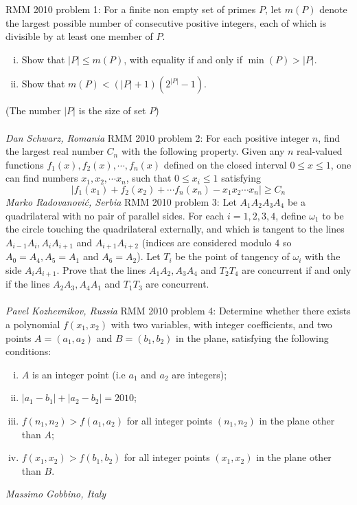 RMM 2010 problem 1:  For a finite non empty set of primes $P$, let $m(P)$ denote the largest possible number of consecutive positive integers, each of which is divisible by at least one member of $P$.
\begin{enumerate}[(i)]
  \item Show that $|P|\le m(P)$, with equality if and only if $\min(P)>|P|$.
  \item Show that $m(P)<(|P|+1)(2^{|P|}-1)$.
\end{enumerate}
(The number $|P|$ is the size of set $P$) \\\\
\textit{Dan Schwarz, Romania} 
RMM 2010 problem 2:  For each positive integer $n$, find the largest real number $C_n$ with the following property. Given any $n$ real-valued functions $f_1(x), f_2(x), \cdots, f_n(x)$ defined on the closed interval $0 \le x \le 1$, one can find numbers $x_1, x_2, \cdots x_n$, such that $0 \le x_i \le 1$ satisfying
\[ |f_1(x_1)+f_2(x_2)+\cdots f_n(x_n)-x_1x_2\cdots x_n| \ge C_n \]
\textit{Marko Radovanović, Serbia} 
RMM 2010 problem 3:  Let $A_1A_2A_3A_4$ be a quadrilateral with no pair of parallel sides. For each $i=1, 2, 3, 4$, define $\omega_1$ to be the circle touching the quadrilateral externally, and which is tangent to the lines $A_{i-1}A_i, A_iA_{i+1}$ and $A_{i+1}A_{i+2}$ (indices are considered modulo $4$ so $A_0=A_4, A_5=A_1$ and $A_6=A_2$). Let $T_i$ be the point of tangency of $\omega_i$ with the side $A_iA_{i+1}$. Prove that the lines $A_1A_2, A_3A_4$ and $T_2T_4$ are concurrent if and only if the lines $A_2A_3, A_4A_1$ and $T_1T_3$ are concurrent. \\\\
\textit{Pavel Kozhevnikov, Russia} 
RMM 2010 problem 4:  Determine whether there exists a polynomial $f(x_1, x_2)$ with two variables, with integer coefficients, and two points $A=(a_1, a_2)$ and $B=(b_1, b_2)$ in the plane, satisfying the following conditions:
\begin{enumerate}[(i)]
  \item $A$ is an integer point (i.e $a_1$ and $a_2$ are integers);
  \item $|a_1-b_1|+|a_2-b_2|=2010$;
  \item $f(n_1, n_2)>f(a_1, a_2)$ for all integer points $(n_1, n_2)$ in the plane other than $A$;
  \item $f(x_1, x_2)>f(b_1, b_2)$ for all integer points $(x_1, x_2)$ in the plane other than $B$.
\end{enumerate}
\textit{Massimo Gobbino, Italy} 
